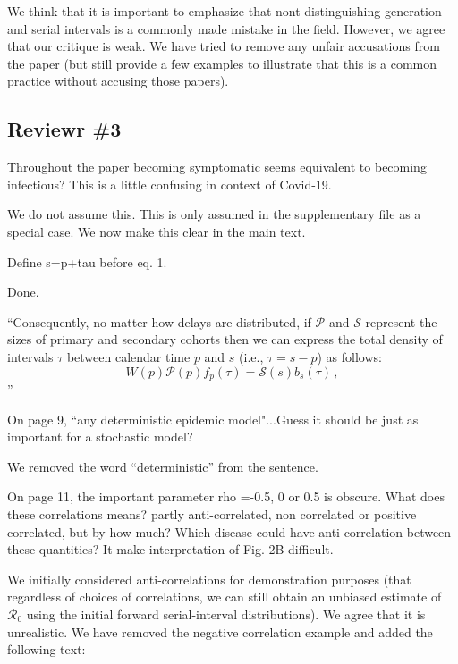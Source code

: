 \documentclass[12pt]{article}
\newcommand{\Ro}{\ensuremath{{\mathcal R}_{0}}\xspace}
\newcommand{\rev}{\subsection*}
\newcommand{\revtext}{\textsf}
\newcommand{\psymp}{\ensuremath{p}} %
\newcommand{\ssymp}{\ensuremath{s}} %
\newcommand{\psize}{{\mathcal P}} %
\newcommand{\ssize}{{\mathcal S}} %
\begin{document}
We think that it is important to emphasize that nont distinguishing generation and serial intervals is a commonly made mistake in the field. 
However, we agree that our critique is weak.
We have tried to remove any unfair accusations from the paper (but still provide a few examples to illustrate that this is a common practice without accusing those papers).

\rev{Reviewr \#3}

\revtext{Throughout the paper becoming symptomatic seems equivalent to becoming infectious? This is a little confusing in context of Covid-19.}

We do not assume this. This is only assumed in the supplementary file as a special case. We now make this clear in the main text.

\revtext{Define s=p+tau before eq. 1.}

Done.

``Consequently, no matter how delays are distributed, if
$\mathcal P$ and $\mathcal S$ represent the sizes of primary and
secondary cohorts then we can express the total density of intervals $\tau$ between calendar time $\psymp$ and $\ssymp$ (i.e., $\tau=\ssymp-\psymp$) as follows:
\begin{equation}
W(\psymp) \psize(\psymp) f_\psymp(\tau) = \ssize(\ssymp) b_\ssymp(\tau) \,,
\label{eq:match}
\end{equation}''

\revtext{On page 9, ``any deterministic epidemic model"...Guess it should be just as important for a stochastic model?}

We removed the word ``deterministic'' from the sentence.

\revtext{On page 11, the important parameter rho =-0.5, 0 or 0.5 is obscure. What does these correlations means? partly anti-correlated, non correlated or positive correlated, but by how much? Which disease could have anti-correlation between these quantities? It make interpretation of Fig. 2B difficult. }

We initially considered anti-correlations for demonstration purposes (that regardless of choices of correlations, we can still obtain an unbiased estimate of \Ro using the initial forward serial-interval distributions). We agree that it is unrealistic. We have removed the negative correlation example and added the following text:
\end{document}
